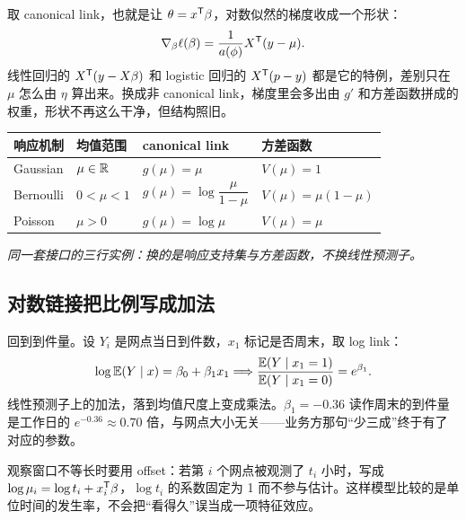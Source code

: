 取 canonical link，也就是让 \(\theta=x^{\mathsf{T}}\beta\)，对数似然的梯度收成一个形状：
\[
\nabla_\beta\ell(\beta)=\frac{1}{a(\phi)}X^{\mathsf{T}}(y-\mu).
\]
线性回归的 \(X^{\mathsf{T}}(y-X\beta)\) 和 logistic 回归的 \(X^{\mathsf{T}}(p-y)\) 都是它的特例，差别只在 \(\mu\) 怎么由 \(\eta\) 算出来。换成非 canonical link，梯度里会多出由 \(g'\) 和方差函数拼成的权重，形状不再这么干净，但结构照旧。

\begin{center}
\begin{tabular}{llll}
\toprule
响应机制 & 均值范围 & canonical link & 方差函数 \\
\midrule
Gaussian & \(\mu\in\mathbb{R}\) & \(g(\mu)=\mu\) & \(V(\mu)=1\) \\
Bernoulli & \(0<\mu<1\) & \(g(\mu)=\log\dfrac{\mu}{1-\mu}\) & \(V(\mu)=\mu(1-\mu)\) \\
Poisson & \(\mu>0\) & \(g(\mu)=\log\mu\) & \(V(\mu)=\mu\) \\
\bottomrule
\end{tabular}
\end{center}

\emph{同一套接口的三行实例：换的是响应支持集与方差函数，不换线性预测子。}

\subsection{对数链接把比例写成加法}

回到到件量。设 \(Y_i\) 是网点当日到件数，\(x_1\) 标记是否周末，取 log link：
\[
\log\mathbb{E}(Y\mid x)=\beta_0+\beta_1x_1
\space\Longrightarrow\space
\frac{\mathbb{E}(Y\mid x_1=1)}{\mathbb{E}(Y\mid x_1=0)}=e^{\beta_1}.
\]
线性预测子上的加法，落到均值尺度上变成乘法。\(\beta_1=-0.36\) 读作周末的到件量是工作日的 \(e^{-0.36}\approx 0.70\) 倍，与网点大小无关——业务方那句``少三成''终于有了对应的参数。

观察窗口不等长时要用 offset：若第 \(i\) 个网点被观测了 \(t_i\) 小时，写成 \(\log\mu_i=\log t_i+x_i^{\mathsf{T}}\beta\)，\(\log t_i\) 的系数固定为 1 而不参与估计。这样模型比较的是单位时间的发生率，不会把``看得久''误当成一项特征效应。

